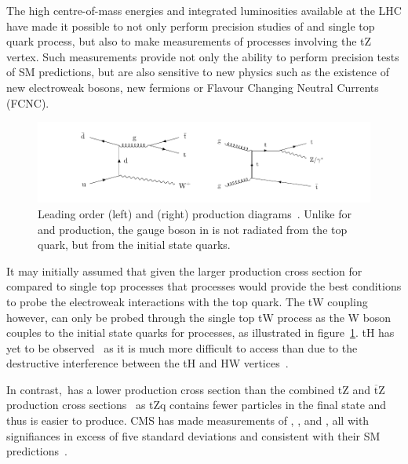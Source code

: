The high centre-of-mass energies and integrated luminosities available at the LHC have made it possible to not only perform precision studies of \ttbar and single top quark process, but also to make measurements of processes involving the tZ vertex.
Such measurements provide not only the ability to perform precision tests of SM predictions, but are also sensitive to new physics such as the existence of new electroweak bosons, new fermions or Flavour Changing Neutral Currents (FCNC).

\begin{figure}[htbp]
\centering
\includegraphics[width=\textwidth]{figs/top-physics/CMS-TOP-17-005_Figure_001.pdf}
\caption{Leading order \ttW (left) and \ttZ (right) production diagrams~\cite{Sirunyan:2017uzs}. Unlike for \ttZ and \ttH production, the gauge boson in \ttW is not radiated from the top quark, but from the initial state quarks.}
\label{fig:feyn_ttV}
\end{figure}

It may initially assumed that given the larger production cross section for \ttbar compared to single top processes that \ttbar processes would provide the best conditions to probe the electroweak interactions with the top quark.
The tW coupling however, can only be probed through the single top tW process as the W boson couples to the initial state quarks for \ttW processes, as illustrated in figure~\ref{fig:feyn_ttV}.
tH has yet to be observed~\cite{CMS:2018jsz} as it is much more difficult to access than \ttH due to the destructive interference between the tH and HW vertices~\cite{Maltoni:2001hu}.


In contrast,~\ttZ has a lower production cross section than the combined tZ and $\overline{\text{t}}$Z production cross sections~\cite{Campbell:2013yla} as tZq contains fewer particles in the final state and thus is easier to produce.
CMS has made measurements of \ttH, \ttW, and \ttZ, all with signifiances in excess of five standard deviations and consistent with their SM predictions~\cite{Sirunyan:2017uzs,Sirunyan:2018hoz}.

